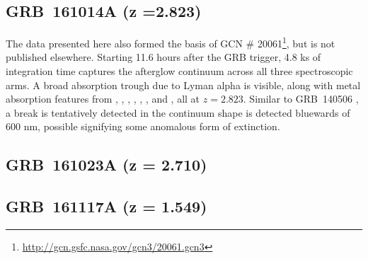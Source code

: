 \documentclass{aa}    %
\begin{document}
\subsection{GRB~161014A (z =2.823)} The data presented here also formed the
basis of GCN \# 20061\footnote{\url{http://gcn.gsfc.nasa.gov/gcn3/20061.gcn3}},
but is not published elsewhere. Starting 11.6 hours after the GRB trigger, 4.8
ks of integration time captures the afterglow continuum across all three
spectroscopic arms. A broad absorption trough due to Lyman alpha is visible,
along with metal absorption features from \mgii, \SIii, \cii, \civ, \alii,
\aliii, and	\feii, all at $z =2.823$. Similar to GRB~140506 \citep{Fynbo2014,
	Heintz2017b},  a break is tentatively detected in the continuum shape is
detected bluewards of 600 nm, possible signifying some anomalous form of
extinction.


\subsection{GRB~161023A (z = 2.710)}	 \label{GRB161023A}


\subsection{GRB~161117A (z = 1.549)}	
\end{document}
